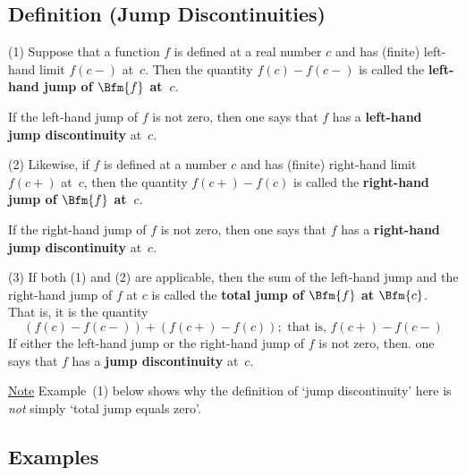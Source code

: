 \VV

            \subsection{\small{\bf Definition} (Jump Discontinuities)}
            \label{DefD50.55}

\V

\hspace*{\parindent}(1) Suppose that a function $f$ is defined at a real number $c$ and has (finite) left-hand limit $f(c-)$ at~$c$.
    Then the quantity $f(c) - f(c-)$ is called the {\bf left-hand jump of $\Bfm{f}$ at~$c$}.

        If the left-hand jump of $f$ is not zero, then one says that $f$ has a {\bf left-hand jump discontinuity} at~$c$.

\V

        (2) Likewise, if $f$ is defined at a number $c$ and has (finite) right-hand limit $f(c+)$ at~$c$,
    then the quantity $f(c+) - f(c)$ is called the {\bf right-hand jump of $\Bfm{f}$ at~$c$}.

        If the right-hand jump of $f$ is not zero, then one says that $f$ has a {\bf right-hand jump discontinuity} at~$c$.

\V

        (3) If both (1) and (2) are applicable, then the sum of the left-hand jump and the right-hand jump of $f$ at $c$
    is called the {\bf total jump of $\Bfm{f}$ at $\Bfm{c}$}. That is, it is the quantity
        \begin{displaymath}
        (f(c) - f(c-)) + (f(c+) - f(c)); \mbox{ that is, } f(c+) - f(c-)
        \end{displaymath}
    If either the left-hand jump or the right-hand jump of $f$ is not zero, then. one says that $f$ has a {\bf jump discontinuity} at~$c$.

        \underline{Note} Example~(1) below shows why the definition of `jump discontinuity' here is {\em not} simply `total jump equals zero'.

\VV

            \subsection{\small{\bf Examples}}
            \label{ExampD50.55A}

\V

